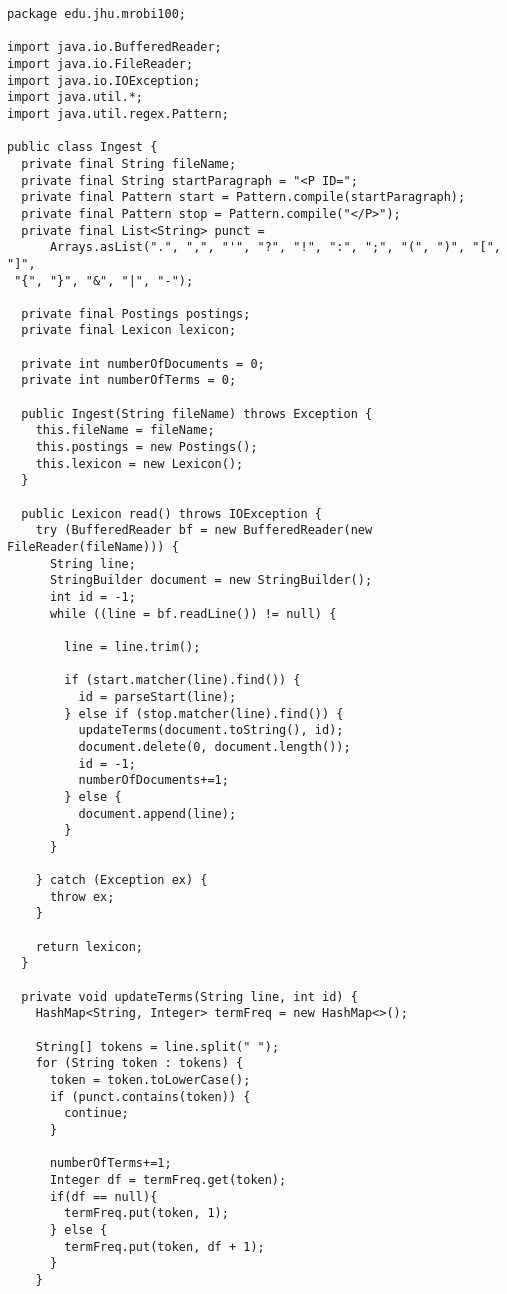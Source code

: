 \documentclass{article}
\begin{document}
\begin{verbatim}
package edu.jhu.mrobi100;

import java.io.BufferedReader;
import java.io.FileReader;
import java.io.IOException;
import java.util.*;
import java.util.regex.Pattern;

public class Ingest {
  private final String fileName;
  private final String startParagraph = "<P ID=";
  private final Pattern start = Pattern.compile(startParagraph);
  private final Pattern stop = Pattern.compile("</P>");
  private final List<String> punct =
      Arrays.asList(".", ",", "'", "?", "!", ":", ";", "(", ")", "[", "]",
 "{", "}", "&", "|", "-");

  private final Postings postings;
  private final Lexicon lexicon;

  private int numberOfDocuments = 0;
  private int numberOfTerms = 0;

  public Ingest(String fileName) throws Exception {
    this.fileName = fileName;
    this.postings = new Postings();
    this.lexicon = new Lexicon();
  }

  public Lexicon read() throws IOException {
    try (BufferedReader bf = new BufferedReader(new FileReader(fileName))) {
      String line;
      StringBuilder document = new StringBuilder();
      int id = -1;
      while ((line = bf.readLine()) != null) {

        line = line.trim();

        if (start.matcher(line).find()) {
          id = parseStart(line);
        } else if (stop.matcher(line).find()) {
          updateTerms(document.toString(), id);
          document.delete(0, document.length());
          id = -1;
          numberOfDocuments+=1;
        } else {
          document.append(line);
        }
      }

    } catch (Exception ex) {
      throw ex;
    }

    return lexicon;
  }

  private void updateTerms(String line, int id) {
    HashMap<String, Integer> termFreq = new HashMap<>();

    String[] tokens = line.split(" ");
    for (String token : tokens) {
      token = token.toLowerCase();
      if (punct.contains(token)) {
        continue;
      }

      numberOfTerms+=1;
      Integer df = termFreq.get(token);
      if(df == null){
        termFreq.put(token, 1);
      } else {
        termFreq.put(token, df + 1);
      }
    }


\end{verbatim}
\end{document}
